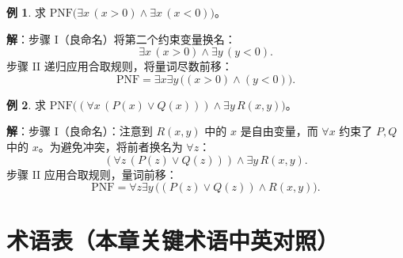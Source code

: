 \documentclass[UTF8,11pt,a4paper]{ctexbook}   %
\theoremstyle{definition}
\newtheorem{example}{例}[section]
\begin{document}
\begin{example}
求 $\mathrm{PNF}\bigl(\exists x\,(x>0)\land\exists x\,(x<0)\bigr)$。

\textbf{解}：步骤 I（良命名）将第二个约束变量换名：
\[
\exists x\,(x>0)\land\exists y\,(y<0).
\]
步骤 II 递归应用合取规则，将量词尽数前移：
\[
\mathrm{PNF}=\exists x\exists y\,\bigl((x>0)\land(y<0)\bigr).
\]
\end{example}

\begin{example}
求 $\mathrm{PNF}\bigl((\forall x\,(P(x)\lor Q(x)))\land\exists y\,R(x,y)\bigr)$。

\textbf{解}：步骤 I（良命名）：注意到 $R(x,y)$ 中的 $x$ 是自由变量，而 $\forall x$ 约束了 $P,Q$ 中的 $x$。为避免冲突，将前者换名为 $\forall z$：
\[
(\forall z\,(P(z)\lor Q(z)))\land\exists y\,R(x,y).
\]
步骤 II 应用合取规则，量词前移：
\[
\mathrm{PNF}=\forall z\exists y\,\bigl((P(z)\lor Q(z))\land R(x,y)\bigr).
\]
\end{example}

\newpage
\section*{术语表（本章关键术语中英对照）}
\end{document}
